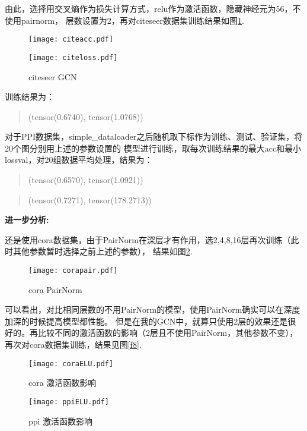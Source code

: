 \documentclass[a4paper,AutoFakeBold,AutoFakeSlant]{ctexart}
\begin{document}
由此，选择用交叉熵作为损失计算方式，relu作为激活函数，隐藏神经元为56，不使用pairnorm，
层数设置为2，再对citeseer数据集训练结果如图\ref{f6}.
\begin{figure}[htbp]
  \centering
  \begin{minipage}[t]{0.48\textwidth}
  \centering
  \texttt{[image: citeacc.pdf]}
  \end{minipage}
  \begin{minipage}[t]{0.48\textwidth}
  \centering
  \texttt{[image: citeloss.pdf]}
  \end{minipage}
  \caption{citeseer GCN}
  \label{f6}
\end{figure}
训练结果为：
\begin{quote}
  (tensor(0.6740), tensor(1.0768))
\end{quote}

对于PPI数据集，simple\_dataloader之后随机取下标作为训练、测试、验证集，将20个图分别用上述的参数设置的
模型进行训练，取每次训练结果的最大acc和最小lossval，对20组数据平均处理，结果为：
\begin{quote}
  (tensor(0.6570), tensor(1.0921))
\end{quote}
\begin{quote}
  (tensor(0.7271), tensor(178.2713))
\end{quote}


\textbf{进一步分析:}

还是使用cora数据集，由于PairNorm在深层才有作用，选2,4,8,16层再次训练（此时其他参数暂时选择之前上述的参数），
结果如图\ref{f7}.
\begin{figure}[htbp]
  \centering
  \texttt{[image: corapair.pdf]}
  \caption{cora PairNorm}
  \label{f7}
\end{figure}

可以看出，对比相同层数的不用PairNorm的模型，使用PairNorm确实可以在深度加深的时候提高模型都性能。
但是在我的GCN中，就算只使用2层的效果还是很好的。再比较不同的激活函数的影响（2层且不使用PairNorm，其他参数不变），
再次对cora数据集训练，结果见图\ref{f8}.
\begin{figure}[htbp]
  \centering
  \begin{minipage}[t]{0.48\textwidth}
  \centering
  \texttt{[image: coraELU.pdf]}
  \caption{cora 激活函数影响}
  \label{f8}
  \end{minipage}
  \begin{minipage}[t]{0.48\textwidth}
  \centering
  \texttt{[image: ppiELU.pdf]}
  \caption{ppi 激活函数影响}
  \label{f9}
  \end{minipage}
\end{figure}
\end{document}
